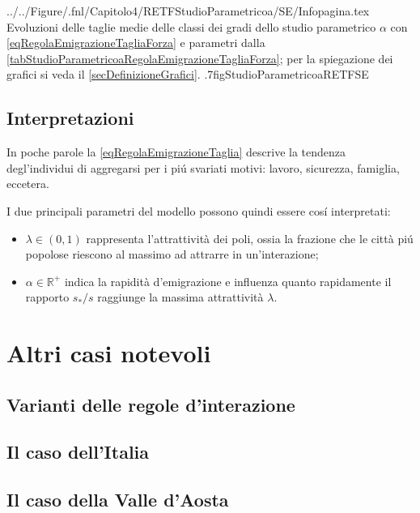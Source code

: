                     {../../Figure/.fnl/Capitolo4/RETFStudioParametricoa/SE/Infopagina.tex}
                    {Evoluzioni delle taglie medie delle classi dei gradi dello studio parametrico \(\alpha\) con \ref{eqRegolaEmigrazioneTagliaForza} e parametri dalla \cref{tabStudioParametricoaRegolaEmigrazioneTagliaForza}; per la spiegazione dei grafici si veda il \cref{secDefinizioneGrafici}.}
                    {.7\linewidth}{figStudioParametricoaRETFSE}

        \subsection{Interpretazioni}

            In poche parole la \eqref{eqRegolaEmigrazioneTaglia} descrive la tendenza degl'individui di aggregarsi per i piú svariati motivi: lavoro, sicurezza, famiglia, eccetera.

            I due principali parametri del modello possono quindi essere cosí interpretati:

            \begin{itemize}[label=\(\diamond\)]
                \item \(\lambda\in(0,1)\) rappresenta l'attrattività dei poli, ossia la frazione che le città piú popolose riescono al massimo ad attrarre in un'interazione;
                \item \(\alpha\in\mathbb R^+\) indica la rapidità d'emigrazione e influenza quanto rapidamente il rapporto \(s_*/s\) raggiunge la massima attrattività \(\lambda\).
            \end{itemize}
        
    \section{Altri casi notevoli}

        \subsection{Varianti delle regole d'interazione}\label{secVariantiRegoleInterazione}

        \subsection{Il caso dell'Italia}\label{secCasoItalia}

        \subsection{Il caso della Valle d'Aosta}\label{secValleDAosta}
